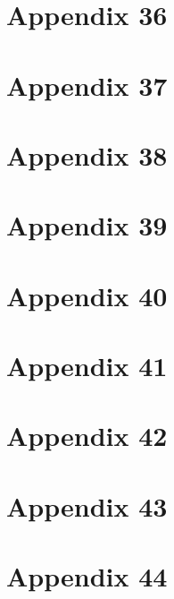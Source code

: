\chapter{Appendix 36}

\chapter{Appendix 37}

\chapter{Appendix 38}

\chapter{Appendix 39}

\chapter{Appendix 40}

\chapter{Appendix 41}

\chapter{Appendix 42}

\chapter{Appendix 43}

\chapter{Appendix 44}

